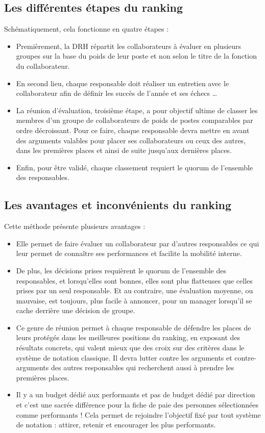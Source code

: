 \subsection{Les différentes étapes du ranking }
Schématiquement, cela fonctionne en quatre étapes : 
\begin{itemize}
\item Premièrement, la DRH répartit les collaborateurs à évaluer en plusieurs groupes sur la base du poids de leur poste et non selon le titre de la fonction du collaborateur.
\item En second lieu, chaque responsable doit réaliser un entretien avec le collaborateur afin de définir les succès de l’année et ses échecs …
\item La réunion d’évaluation, troisième étape, a pour objectif ultime de classer les membres d’un groupe de collaborateurs de poids de postes comparables par ordre décroissant. Pour ce faire, chaque responsable devra mettre en avant des arguments valables pour placer ses collaborateurs ou ceux des autres, dans les premières places et ainsi de suite jusqu’aux dernières places.
\item Enfin, pour être validé, chaque classement requiert le quorum de l’ensemble des responsables.
\end{itemize}

\subsection{Les avantages et inconvénients du ranking}
Cette méthode présente plusieurs avantages :
\begin{itemize}
\item Elle permet de faire évaluer un collaborateur par d’autres responsables ce qui leur permet de connaître ses performances et facilite la mobilité interne.
\item De plus, les décisions prises requièrent le quorum de l’ensemble des responsables, et lorsqu’elles sont bonnes, elles sont plus flatteuses que celles prises par un seul responsable. Et au contraire, une évaluation moyenne, ou mauvaise, est toujours, plus facile à annoncer, pour un manager lorsqu’il se cache derrière une décision de groupe.
\item Ce genre de réunion permet à chaque responsable de défendre les places de leurs protégés dans les meilleures positions du ranking, en exposant des résultats concrets, qui valent mieux que des croix sur des critères dans le système de notation classique. Il devra lutter contre les arguments et contre-arguments des autres responsables qui recherchent aussi à prendre les premières places.
\item Il y a un budget dédié aux performants et pas de budget dédié par direction et c’est une sacrée différence pour la fiche de paie des personnes sélectionnées comme performants ! Cela permet de rejoindre l’objectif fixé par tout système de notation : attirer, retenir et encourager les plus performants.
\end{itemize}

